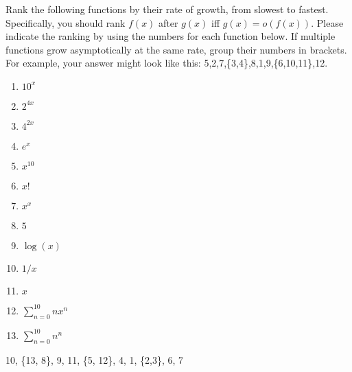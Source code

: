 \documentclass[solution,letterpaper]{cs20}
\begin{document}
\begin{problem}
Rank the following functions by their rate of growth, from slowest to fastest.
Specifically, you should rank $f(x)$ after $g(x)$ iff $g(x)=o(f(x))$. Please
indicate the ranking by using the numbers for each function below. If multiple
functions grow asymptotically at the same rate, group their numbers in brackets.
For example, your answer might look like this: 5,2,7,\{3,4\},8,1,9,\{6,10,11\},12.
\begin{multicols}{2}
\begin{enumerate}
\item $10^x$
\item $2^{4x}$
\item $4^{2x}$
\item $e^x$
\item $x^{10}$
\item $x!$
\item $x^x$
\item $5$
\item $\log(x)$
\item $1/x$
\item $x$
\item $\displaystyle \sum^{10}_{n=0} nx^n$
\item $\displaystyle \sum^{10}_{n=0} n^n$
\end{enumerate}
\end{multicols}
\begin{solution}
10, \{13, 8\}, 9, 11, \{5, 12\}, 4, 1, \{2,3\}, 6, 7
\end{solution}
\end{problem}
\newpage
\end{document}
